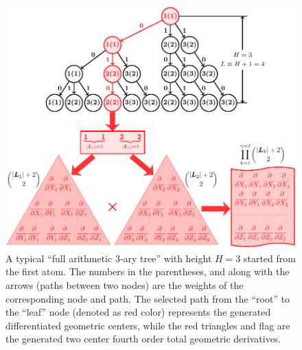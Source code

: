 \documentclass[a4paper,11pt,twoside,openright]{book}
\begin{document}
\begin{figure}[hbtp]
  \centering
  \includegraphics[width=12cm]{n_ary_tree.pdf}
  \caption{A typical ``full arithmetic $3$-ary tree'' with height $H=3$ started from the first atom. The numbers
  in the parentheses, and along with the arrows (paths between two nodes) are the weights of the corresponding
  node and path. The selected path from the ``root'' to the ``leaf'' node (denoted as red color) represents the
  generated differentiated geometric centers, while the red triangles and flag are the generated two center
  fourth order total geometric derivatives.}
  \label{fig:n-ary-tree}
\end{figure}
\end{document}

